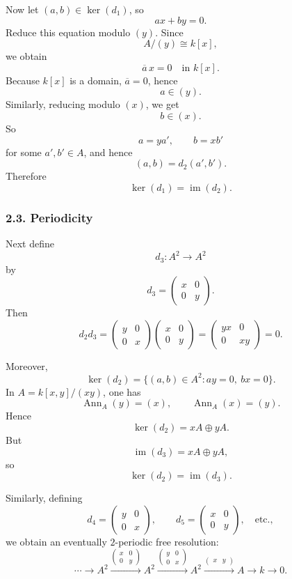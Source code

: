 \documentclass[12pt,a4paper]{article}
\theoremstyle{notespace}
\DeclareMathOperator{\Ann}{Ann}
\begin{document}
Now let \((a,b)\in \ker(d_1)\), so
\[
ax+by=0.
\]
Reduce this equation modulo \((y)\). Since
\[
A/(y)\cong k[x],
\]
we obtain
\[
\overline{a}\,x=0 \quad \text{in } k[x].
\]
Because \(k[x]\) is a domain, \(\overline{a}=0\), hence
\[
a\in (y).
\]
Similarly, reducing modulo \((x)\), we get
\[
b\in (x).
\]
So
\[
a=ya',\qquad b=xb'
\]
for some \(a',b'\in A\), and hence
\[
(a,b)=d_2(a',b').
\]
Therefore
\[
\ker(d_1)=\operatorname{im}(d_2).
\]

\subsubsection{2.3. Periodicity}

Next define
\[
d_3:A^2\to A^2
\]
by
\[
d_3=
\begin{pmatrix}
	x & 0\\
	0 & y
\end{pmatrix}.
\]
Then
\[
d_2d_3=
\begin{pmatrix}
	y & 0\\
	0 & x
\end{pmatrix}
\begin{pmatrix}
	x & 0\\
	0 & y
\end{pmatrix}
=
\begin{pmatrix}
	yx & 0\\
	0 & xy
\end{pmatrix}
=
0.
\]

Moreover,
\[
\ker(d_2)=\{(a,b)\in A^2 : ay=0,\ bx=0\}.
\]
In \(A=k[x,y]/(xy)\), one has
\[
\Ann_A(y)=(x),
\qquad
\Ann_A(x)=(y).
\]
Hence
\[
\ker(d_2)=xA\oplus yA.
\]
But
\[
\operatorname{im}(d_3)=xA\oplus yA,
\]
so
\[
\ker(d_2)=\operatorname{im}(d_3).
\]

Similarly, defining
\[
d_4=
\begin{pmatrix}
	y & 0\\
	0 & x
\end{pmatrix},
\qquad
d_5=
\begin{pmatrix}
	x & 0\\
	0 & y
\end{pmatrix},
\quad \text{etc.},
\]
we obtain an eventually \(2\)-periodic free resolution:
\[
\cdots
\longrightarrow A^2
\xrightarrow{\begin{pmatrix}x&0\\0&y\end{pmatrix}}
A^2
\xrightarrow{\begin{pmatrix}y&0\\0&x\end{pmatrix}}
A^2
\xrightarrow{\begin{pmatrix}x&y\end{pmatrix}}
A
\longrightarrow k
\longrightarrow 0.
\]
\end{document}
